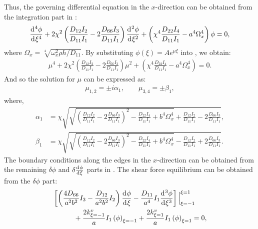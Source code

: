 \documentclass[preprint,12pt]{elsarticle}
\newcommand{\id}{\mathrm{d}\mkern1mu}
\begin{document}
%
Thus, the governing differential equation in the $ x $-direction can be obtained from the integration part in :
%
%
\begin{equation}\label{eq:ODEx}
		\frac{\id^4 \phi}{\id \xi^4}+ 2\chi^2\left(\frac{D_{12}I_2}{D_{11}I_1}-2\frac{D_{66}I_3}{D_{11}I_1}\right)\frac{\id^2 \phi}{\id \xi^2}+\left(\chi^4\frac{D_{22}I_4}{D_{11}I_1}-a^4\Omega_x^4\right)\phi=0,
\end{equation}
%
where $\Omega_x = \sqrt[4]{\omega_x^2 \rho h / D_{11}}$.
By substituting $\phi(\xi) = A e^{\mu \xi}$ into , we obtain:
%
\begin{equation}\label{eq:ODEx2}
	\begin{split}
		\mu^4 + 2\chi^2\left(\frac{D_{12}I_2}{D_{11}I_1}-2\frac{D_{66}I_3}{D_{11}I_1}\right)\mu^2 + \left(\chi^4\frac{D_{22}I_4}{D_{11}I_1}-a^4\Omega_x^4\right) = 0.
	\end{split}
\end{equation}
%
And so the solution for $\mu$ can be expressed as:
%
\begin{equation}\label{eq:mu}
	\begin{split}
		\mu_{1,2} = \pm\textit{i} \alpha_1, \qquad \mu_{3,4} = \pm \beta_1,
	\end{split}
\end{equation}
%
where,
%
\begin{subequations}\label{eq:alphax}
	\begin{align}
		\alpha_1 &= \chi \sqrt{\sqrt{\left(\frac{D_{12}I_2}{D_{11}I_1}-2\frac{D_{66}I_3}{D_{11}I_1}\right)^2 - \frac{D_{22}I_4}{D_{11}I_1} + b^4\Omega_x^4} + \frac{D_{12}I_2}{D_{11}I_1} - 2\frac{D_{66}I_3}{D_{11}I_1}},\label{eq:alphax1}\\
		\beta_1 &= \chi \sqrt{\sqrt{\left(\frac{D_{12}I_2}{D_{11}I_1}-2\frac{D_{66}I_3}{D_{11}I_1}\right)^2 - \frac{D_{22}I_4}{D_{11}I_1} + b^4\Omega_x^4} - \frac{D_{12}I_2}{D_{11}I_1} + 2\frac{D_{66}I_3}{D_{11}I_1}}.\label{eq:alphax2}
	\end{align}
\end{subequations}
%
The boundary conditions along the edges in the $x$-direction can be obtained from the remaining $\delta \phi$ and $\delta \frac{\id \phi}{\id \xi}$ parts in . 
The shear force equilibrium can be obtained from the $\delta \phi$ part:
%
\begin{equation}\label{eq:inertial_forcex}
	\begin{split}
		&\left[ \left( \frac{4D_{66}}{a^2b^2} I_3 - \frac{D_{12}}{a^2b^2} I_2 \right) \frac{\id \phi}{\id \xi} 
		- \frac{D_{11}}{a^4} I_1 \frac{\id^3 \phi}{\id \xi^3} \right] \Big|^{\xi=1}_{\xi=-1}\\
		&\quad\qquad+ \frac{2k^v_{\xi=-1}}{a} I_1 \left(\phi\right)_{\xi=-1}
		 + \frac{2k^v_{\xi=1}}{a} I_1 \left(\phi\right)_{\xi=1} = 0,
	\end{split}
\end{equation}
\end{document}
